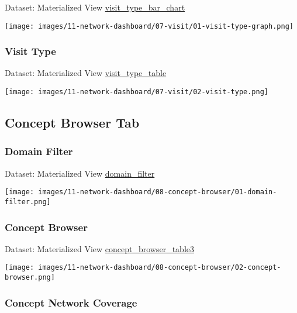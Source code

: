 \documentclass[
]{book}
\begin{document}
Dataset: Materialized View \href{materialized-views-1.html\#visit_type_bar_chart}{visit\_type\_bar\_chart}

\texttt{[image: images/11-network-dashboard/07-visit/01-visit-type-graph.png]}

\hypertarget{visit-type}{%
\subsubsection*{Visit Type}\label{visit-type}}

Dataset: Materialized View \href{materialized-views-1.html\#visit_type_table}{visit\_type\_table}

\texttt{[image: images/11-network-dashboard/07-visit/02-visit-type.png]}

\hypertarget{concept-browser-tab}{%
\subsection*{Concept Browser Tab}\label{concept-browser-tab}}

\hypertarget{domain-filter}{%
\subsubsection*{Domain Filter}\label{domain-filter}}

Dataset: Materialized View \href{materialized-views-1.html\#domain_filter}{domain\_filter}

\texttt{[image: images/11-network-dashboard/08-concept-browser/01-domain-filter.png]}

\hypertarget{concept-browser}{%
\subsubsection*{Concept Browser}\label{concept-browser}}

Dataset: Materialized View \href{materialized-views-1.html\#concept_browser_table3}{concept\_browser\_table3}

\texttt{[image: images/11-network-dashboard/08-concept-browser/02-concept-browser.png]}

\hypertarget{concept-network-coverage}{%
\subsubsection*{Concept Network Coverage}\label{concept-network-coverage}}
\end{document}
